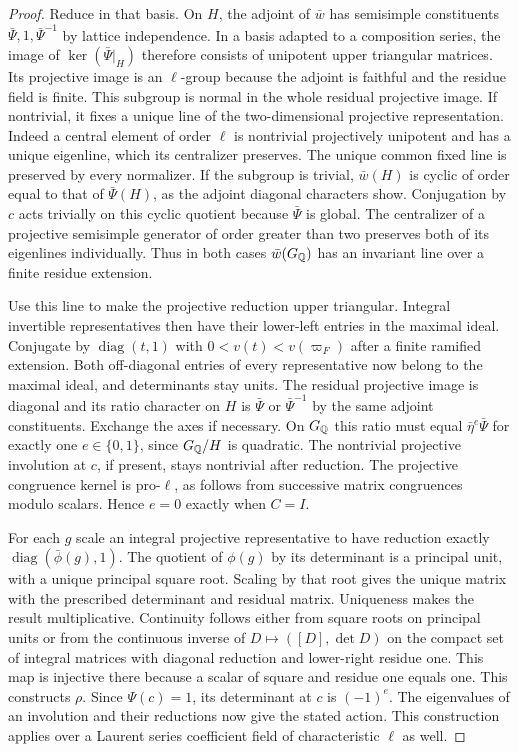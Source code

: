 \documentclass[a4paper,11pt]{article}
\theoremstyle{definition}
\theoremstyle{remark}
\numberwithin{equation}{section}
\begin{document}
\begin{proof}
Reduce in that basis. On \(H\), the adjoint of \(\bar w\)
has semisimple constituents \(\bar\Psi,1,\bar\Psi^{-1}\) by
lattice independence. In a basis adapted to a composition
series, the image of \(\ker(\bar\Psi|_H)\) therefore consists
of unipotent upper triangular matrices. Its projective image
is an \(\ell\)-group because the adjoint is faithful and the
residue field is finite. This subgroup is normal in the whole
residual projective image. If nontrivial, it fixes a unique
line of the two-dimensional projective representation. Indeed
a central element of order \(\ell\) is nontrivial projectively
unipotent and has a unique eigenline, which its centralizer
preserves. The unique common fixed line is preserved by
every normalizer. If the subgroup is trivial, \(\bar w(H)\)
is cyclic of order equal to that of \(\bar\Psi(H)\), as the
adjoint diagonal characters show. Conjugation by \(c\)
acts trivially on this cyclic quotient because \(\bar\Psi\)
is global. The centralizer of a projective semisimple generator
of order greater than two preserves both of its eigenlines
individually. Thus in both cases \(\bar w(G_\mathbb Q)\) has an
invariant line over a finite residue extension.

Use this line to make the projective reduction upper triangular.
Integral invertible representatives then have their lower-left
entries in the maximal ideal. Conjugate by
\(\operatorname{diag}(t,1)\) with \(0<v(t)<v(\varpi_F)\)
after a finite ramified extension. Both off-diagonal entries
of every representative now belong to the maximal ideal,
and determinants stay units. The residual projective image
is diagonal and its ratio character on \(H\) is
\(\bar\Psi\) or \(\bar\Psi^{-1}\) by the same adjoint
constituents. Exchange the axes if necessary. On \(G_\mathbb Q\)
this ratio must equal \(\bar\eta^e\bar\Psi\) for exactly
one \(e\in\{0,1\}\), since \(G_\mathbb Q/H\) is quadratic.
The nontrivial projective involution at \(c\), if present,
stays nontrivial after reduction. The projective congruence
kernel is pro-\(\ell\), as follows from successive matrix
congruences modulo scalars. Hence \(e=0\) exactly when \(C=I\).

For each \(g\) scale an integral projective representative to
have reduction exactly \(\operatorname{diag}(\bar\phi(g),1)\).
The quotient of \(\phi(g)\) by its determinant is a principal
unit, with a unique principal square root. Scaling by that
root gives the unique matrix with the prescribed determinant
and residual matrix. Uniqueness makes the result multiplicative.
Continuity follows either from square roots on principal units
or from the continuous inverse of
\(D\mapsto([D],\det D)\) on the compact set of integral
matrices with diagonal reduction and lower-right residue one.
This map is injective there because a scalar of square and
residue one equals one. This constructs \(\rho\).
Since \(\Psi(c)=1\), its determinant at \(c\) is \((-1)^e\).
The eigenvalues of an involution and their reductions now give
the stated action. This construction applies over a Laurent
series coefficient field of characteristic \(\ell\) as well.
\end{proof}
\end{document}

